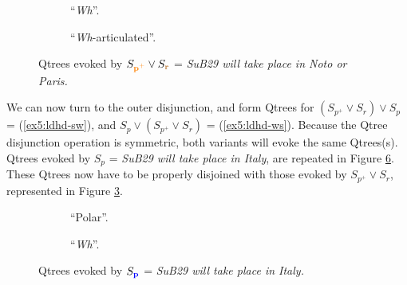 \begin{figure}[H]
	\centering
	\begin{subfigure}[b]{.45\linewidth}
		\centering
		\caption[]{``\textit{Wh}''.}\label{fig5:qtree-noto-or-paris-wh}
	\end{subfigure}\hfill
	\begin{subfigure}[b]{.45\linewidth}
		\centering
		\caption[]{``\textit{Wh}-articulated''.}\label{fig5:qtree-noto-or-paris-tiered}
	\end{subfigure}
	\caption[]{Qtrees evoked by $S_{\textbf{\textcolor{orange}{p$^+$}}} \vee S_{\textbf{\textcolor{brown}{r}}}$ = \textit{SuB29 will take place in Noto or Paris.}}\label{fig5:qtrees-noto-or-paris}
\end{figure}

We can now turn to the outer disjunction, and form Qtrees for $(S_{p^+}\vee S_r) \vee S_p$ = (\ref{ex5:ldhd-sw}), and $S_p \vee (S_{p^+}\vee S_r)$ = (\ref{ex5:ldhd-ws}). Because the Qtree disjunction operation is symmetric, both variants will evoke the same Qtrees(s). Qtrees evoked by $S_p$ = \textit{SuB29 will take place in Italy}, are repeated in Figure \ref{fig5:qtrees-italy-r}. These Qtrees now have to be properly disjoined with those evoked by $S_{p^+} \vee S_r$, represented in Figure \ref{fig5:qtrees-noto-or-paris}.

\begin{figure}[H]
	\centering
	\begin{subfigure}[b]{.45\linewidth}
		\centering
		\caption[]{``Polar''.}\label{fig5:qtree-italy-polar-r}
	\end{subfigure}\hfill
	\begin{subfigure}[b]{.45\linewidth}
		\centering
		\caption[]{``\textit{Wh}''.}\label{fig5:qtree-italy-wh-r}
	\end{subfigure}
	\caption[]{Qtrees evoked by $S_{\textbf{\textcolor{blue}{p}}}$ = \textit{SuB29 will take place in Italy.}}\label{fig5:qtrees-italy-r}
\end{figure}

